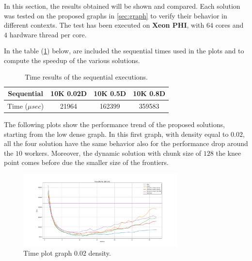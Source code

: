 In this section, the results obtained will be shown and compared. Each solution was tested on the proposed graphs in \ref{sec:graph} to verify their behavior in different contexts. 
The test has been executed on \textbf{Xeon PHI}, with $64$ cores and $4$ hardware thread per core. 

In the table (\ref{table:seq_times}) below, are included the sequential times used in the plots and to compute the speedup of the various solutions.
\begin{table}[htb!]
\centering
\begin{tabular}{|c|c|c|c|}
\hline
Sequential & 10K 0.02D & 10K 0.5D & 10K 0.8D \\ \hline
Time ($\mu sec$)          & 21964     & 162399   & 359583   \\ \hline
\end{tabular}
\caption{Time results of the sequential executions.}
\label{table:seq_times}
\end{table}
\FloatBarrier

The following plots show the performance trend of the proposed solutions, starting from the low dense graph.
In this first graph, with density equal to $0.02$, all the four solution have the same behavior also for the performance drop around the $10$ workers. Moreover, the dynamic solution with chunk size of $128$ the knee point comes before due the smaller size of the frontiers.
\begin{figure}[htb!]
    \centering
    \includegraphics[width=0.75\textwidth]{Figures/plot_map_time_vs10K002.png}
    \caption{Time plot graph 0.02 density.}
    \label{fig:plot_time_10k_002}
\end{figure}
\FloatBarrier

